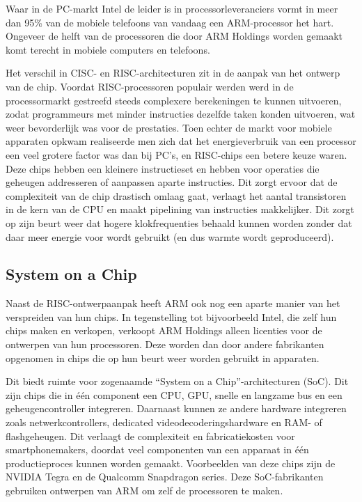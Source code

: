 Waar in de PC-markt Intel de leider is in processorleveranciers vormt in meer dan 95\% van de mobiele telefoons van vandaag een ARM-processor het hart. Ongeveer de helft van de processoren die door ARM Holdings worden gemaakt komt terecht in mobiele computers en telefoons. \citep{economistarm}

Het verschil in CISC- en RISC-architecturen zit in de aanpak van het ontwerp van de chip.
Voordat RISC-processoren populair werden werd in de processormarkt gestreefd steeds complexere berekeningen te kunnen uitvoeren, zodat programmeurs met minder instructies dezelfde taken konden uitvoeren, wat weer bevorderlijk was voor de prestaties.
Toen echter de markt voor mobiele apparaten opkwam realiseerde men zich dat het energieverbruik van een processor een veel grotere factor was dan bij PC's, en RISC-chips een betere keuze waren.
Deze chips hebben een kleinere instructieset en hebben voor operaties die geheugen addresseren of aanpassen aparte instructies. 
Dit zorgt ervoor dat de complexiteit van de chip drastisch omlaag gaat, verlaagt het aantal transistoren in de kern van de CPU en maakt pipelining van instructies makkelijker.
Dit zorgt op zijn beurt weer dat hogere klokfrequenties behaald kunnen worden zonder dat daar meer energie voor wordt gebruikt (en dus warmte wordt geproduceerd). \citep{stanfordrisc}

\subsection{System on a Chip}

Naast de RISC-ontwerpaanpak heeft ARM ook nog een aparte manier van het verspreiden van hun chips.
In tegenstelling tot bijvoorbeeld Intel, die zelf hun chips maken en verkopen, verkoopt ARM Holdings alleen licenties voor de ontwerpen van hun processoren.
Deze worden dan door andere fabrikanten opgenomen in chips die op hun beurt weer worden gebruikt in apparaten.

Dit biedt ruimte voor zogenaamde ``System on a Chip''-architecturen (SoC).
Dit zijn chips die in \'e\'en component een CPU, GPU, snelle en langzame bus en een geheugencontroller integreren.
Daarnaast kunnen ze andere hardware integreren zoals netwerkcontrollers, dedicated videodecoderingshardware en RAM- of flashgeheugen.
Dit verlaagt de complexiteit en fabricatiekosten voor smartphonemakers, doordat veel componenten van een apparaat in \'e\'en productieproces kunnen worden gemaakt.
Voorbeelden van deze chips zijn de NVIDIA Tegra en de Qualcomm Snapdragon series.
Deze SoC-fabrikanten gebruiken ontwerpen van ARM om zelf de processoren te maken.

